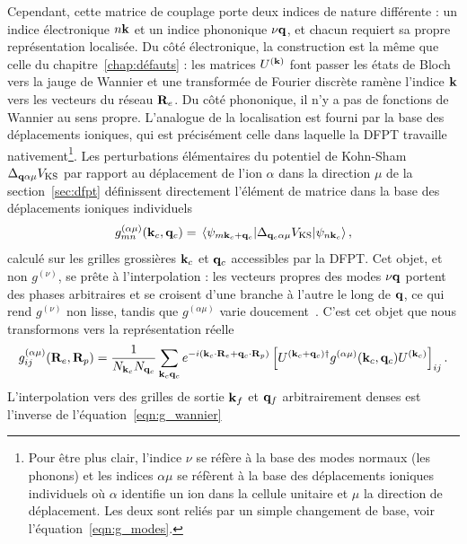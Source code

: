 Cependant, cette matrice de couplage porte deux indices de nature différente : un indice électronique $n\mathbf{k}$ et un indice phononique $\nu\mathbf{q}$, et chacun requiert sa propre représentation localisée. Du côté électronique, la construction est la même que celle du chapitre~\ref{chap:défauts} : les matrices $U^{(\mathbf{k})}$ font passer les états de Bloch vers la jauge de Wannier et une transformée de Fourier discrète ramène l'indice $\mathbf{k}$ vers les vecteurs du réseau $\mathbf{R}_e$. Du côté phononique, il n'y a pas de fonctions de Wannier au sens propre. L'analogue de la localisation est fourni par la base des déplacements ioniques, qui est précisément celle dans laquelle la DFPT travaille nativement\footnote{Pour être plus clair, l'indice $\nu$ se réfère à la base des modes normaux (les phonons) et les indices $\alpha\mu$ se réfèrent à la base des déplacements ioniques individuels où $\alpha$ identifie un ion dans la cellule unitaire et $\mu$ la direction de déplacement. Les deux sont reliés par un simple changement de base, voir l'équation~\eqref{eqn:g_modes}.}. Les perturbations élémentaires du potentiel de Kohn-Sham $\Delta_{\mathbf{q}\alpha\mu}V_\text{KS}$ par rapport au déplacement de l'ion $\alpha$ dans la direction $\mu$ de la section~\ref{sec:dfpt} définissent directement l'élément de matrice dans la base des déplacements ioniques individuels
\begin{equation}
    g_{mn}^{(\alpha\mu)}(\kv_c,\qv_c) =
    \matrixel{\psi_{m\kv_c+\qv_c}}{\Delta_{\qv_c\alpha\mu}V_\text{KS}}{\psi_{n\kv_c}},\label{eqn:g_atomique}
\end{equation}
calculé sur les grilles grossières $\mathbf{k}_c$ et $\mathbf{q}_c$ accessibles par la DFPT. Cet objet, et non $g^{(\nu)}$, se prête à l'interpolation : les vecteurs propres des modes $\nu\mathbf{q}$ portent des phases arbitraires et se croisent d'une branche à l'autre le long de $\mathbf{q}$, ce qui rend $g^{(\nu)}$ non lisse, tandis que $g^{(\alpha\mu)}$ varie doucement~\cite{giustinoElectronphononInteractionsFirst2017,ponceEPWElectronphononCoupling2016}. C'est cet objet que nous transformons vers la représentation réelle
\begin{equation}
    g_{ij}^{(\alpha\mu)}(\mathbf{R}_e,\mathbf{R}_p) =
    \frac{1}{N_{\mathbf{k}_c}N_{\mathbf{q}_c}}\sum_{\mathbf{k}_c\mathbf{q}_c}
    e^{-i(\mathbf{k}_c\cdot\mathbf{R}_e+\mathbf{q}_c\cdot\mathbf{R}_p)}
    \left[U^{(\mathbf{k}_c+\mathbf{q}_c)\dag}g^{(\alpha\mu)}(\mathbf{k}_c,\mathbf{q}_c)U^{(\mathbf{k}_c)}\right]_{ij}.
    \label{eqn:g_wannier}
\end{equation}
L'interpolation vers des grilles de sortie $\mathbf{k}_f$ et $\mathbf{q}_f$ arbitrairement denses est l'inverse de l'équation~\eqref{eqn:g_wannier}
